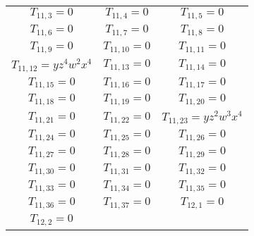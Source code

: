 \documentclass[12pt]{memoireuqam1.3}
\begin{document}
\begin{longtable}{|c|c|c|}
$T_{11,3}= 0$&

$T_{11,4}= 0$&

$T_{11,5}= 0$\\

$T_{11,6}= 0$&

$T_{11,7}= 0$&

$T_{11,8}= 0$\\

$T_{11,9}= 0$&

$T_{11,10}= 0$&

$T_{11,11}= 0$\\

$T_{11,12}= yz^4w^2x^4$&

$T_{11,13}= 0$&

$T_{11,14}= 0$\\

$T_{11,15}= 0$&

$T_{11,16}= 0$&

$T_{11,17}= 0$\\

$T_{11,18}= 0$&

$T_{11,19}= 0$&

$T_{11,20}= 0$\\

$T_{11,21}= 0$&

$T_{11,22}= 0$&

$T_{11,23}= yz^2w^3x^4$\\

$T_{11,24}= 0$&

$T_{11,25}= 0$&

$T_{11,26}= 0$\\

$T_{11,27}= 0$&

$T_{11,28}= 0$&

$T_{11,29}= 0$\\

$T_{11,30}= 0$&

$T_{11,31}= 0$&

$T_{11,32}= 0$\\

$T_{11,33}= 0$&

$T_{11,34}= 0$&

$T_{11,35}= 0$\\

$T_{11,36}= 0$&

$T_{11,37}= 0$&

$T_{12,1}= 0$\\

$T_{12,2}= 0$&


\end{longtable}
\end{document}
